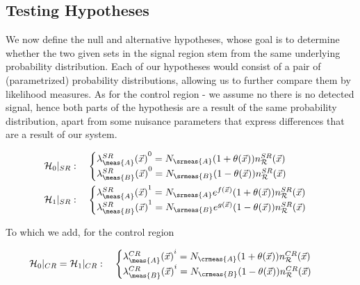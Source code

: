 \documentclass[../../ddppaper2.tex]{subfiles}
\begin{document}
\subsection{Testing Hypotheses}

We now define the null and alternative hypotheses, whose goal is to determine whether the two given sets in the signal region stem from the same underlying probability distribution. Each of our hypotheses would consist of a pair of (parametrized) probability distributions, allowing us to further compare them by likelihood measures.
As for the control region - we assume no there is no detected signal, hence both parts of the hypothesis are a result of the same probability distribution, apart from some nuisance parameters that express differences that are a result of our system.

\begin{equation}
\begin{aligned}
    \nullhypothesis |_{SR} &: \quad
    \begin{cases}
        {\srdist{\meas{A}}^0} = N_\srmeas{A} (1 + {\nparam(\anyevent)}) \srrefdist \\
        {\srdist{\meas{B}}^0} = N_\srmeas{B} (1 - {\nparam(\anyevent)}) \srrefdist
    \end{cases} \\
    \hypothesis{1} |_{SR} &: \quad
    \begin{cases}
        {\srdist{\meas{A}}^1} = N_\srmeas{A} e^{f(\anyevent)} (1 + {\nparam(\anyevent)}) \srrefdist \\
        {\srdist{\meas{B}}^1} = N_\srmeas{B} e^{g(\anyevent)} (1 - {\nparam(\anyevent)}) \srrefdist
    \end{cases}
\end{aligned}
\end{equation}

To which we add, for the control region

\begin{equation}
\begin{aligned}
    \nullhypothesis |_{CR} = \hypothesis{1} |_{CR} &: \quad
    \begin{cases}
        \crdist{\meas{A}}^i = N_\crmeas{A} (1 + {\nparam(\anyevent)}) \crrefdist \\
        \crdist{\meas{B}}^i = N_\crmeas{B} (1 - {\nparam(\anyevent)}) \crrefdist
    \end{cases}
\end{aligned}
\end{equation}
\end{document}
